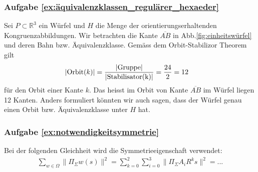\subsubsection*{Aufgabe \ref{ex:äquivalenzklassen_regulärer_hexaeder}}
Sei $P \subset \mathbb{R}^3$ ein Würfel und $H$ die Menge der orientierungserhaltenden Kongruenzabbildungen. Wir betrachten die Kante $\overline{AB}$ in Abb.\ref{fig:einheitswürfel} und deren Bahn bzw. Äquivalenzklasse. Gemäss dem Orbit-Stabilizor Theorem gilt 
\begin{align}
    |\textnormal{Orbit}(k)| &= \frac{|\textnormal{Gruppe}|}{|\textnormal{Stabilisator(k)}|} = \frac{24}{2} = 12 \nonumber
\end{align}
für den Orbit einer Kante $k$. Das heisst im Orbit von Kante $\overline{AB}$ im Würfel liegen 12 Kanten. Anders formuliert könnten wir auch sagen, dass der Würfel genau einen Orbit bzw. Äquivalenzklasse unter $H$ hat.

\subsubsection*{Aufgabe \ref{ex:notwendigkeitsymmetrie}}
Bei der folgenden Gleichheit wird die Symmetrieeigenschaft verwendet: 
\begin{align} 
    \sum_{w \in \Omega} \|\Pi_{\Sigma}w(s)\|^2  = \sum_{k=0}^2 \sum_{i=0}^3 \|\Pi_{\Sigma}A_iR^ks\|^2 = ... \nonumber
\end{align}
